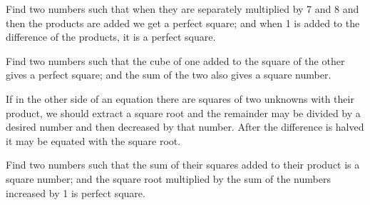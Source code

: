 \documentclass[]{article}
\begin{document}
{Find two numbers such that when they are separately multiplied by 7 and
8 and then the products are added we get a perfect square; and when 1 is
added to the difference of the products, it is a perfect square.}

\begin{quote}  {
}  \end{quote}

{Find two numbers such that the cube of one added to the square of the
other gives a perfect square; and the sum of the two also gives a square
number.}

\begin{quote}  {
}  \end{quote}

{If in the other side of an equation there are squares of two unknowns
with their product, we should extract a square root and the remainder
may be divided by a desired number and then decreased by that number.
After the difference is halved it may be equated with the square root.}

\begin{quote}  {
}  \end{quote}

{Find two numbers such that the sum of their squares added to their
product is a square number; and the square root multiplied by the sum of
the numbers increased by 1 is perfect square.}

\begin{quote}  {}  \end{quote}
\newpage
\large

\begin{quote}  {
}  \end{quote}
\end{document}
